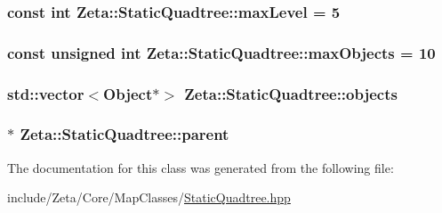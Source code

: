 \hypertarget{classZeta_1_1StaticQuadtree_a048cc44a90aab6c8971d18c294da8648}{
\subsubsection[{max\+Level}]{\setlength{\rightskip}{0pt plus 5cm}const int Zeta\+::\+Static\+Quadtree\+::max\+Level = 5\hspace{0.3cm}{\ttfamily [private]}}}\label{classZeta_1_1StaticQuadtree_a048cc44a90aab6c8971d18c294da8648}
\hypertarget{classZeta_1_1StaticQuadtree_a18f3e883d1a83290f6290ae30fda27af}{
\subsubsection[{max\+Objects}]{\setlength{\rightskip}{0pt plus 5cm}const unsigned int Zeta\+::\+Static\+Quadtree\+::max\+Objects = 10\hspace{0.3cm}{\ttfamily [private]}}}\label{classZeta_1_1StaticQuadtree_a18f3e883d1a83290f6290ae30fda27af}
\hypertarget{classZeta_1_1StaticQuadtree_a96f2f99c2fb37d79ae230ce0fd547f0d}{
\subsubsection[{objects}]{\setlength{\rightskip}{0pt plus 5cm}std\+::vector$<${\bf Object}$\ast$$>$ Zeta\+::\+Static\+Quadtree\+::objects\hspace{0.3cm}{\ttfamily [private]}}}\label{classZeta_1_1StaticQuadtree_a96f2f99c2fb37d79ae230ce0fd547f0d}
\hypertarget{classZeta_1_1StaticQuadtree_adc1adf63b09a4d7d322602a72b89803d}{
\subsubsection[{parent}]{$\ast$ Zeta\+::\+Static\+Quadtree\+::parent\hspace{0.3cm}{\ttfamily [private]}}}\label{classZeta_1_1StaticQuadtree_adc1adf63b09a4d7d322602a72b89803d}


The documentation for this class was generated from the following file\+:\begin{DoxyCompactItemize}
\item 
include/\+Zeta/\+Core/\+Map\+Classes/\hyperlink{StaticQuadtree_8hpp}{Static\+Quadtree.\+hpp}\end{DoxyCompactItemize}

